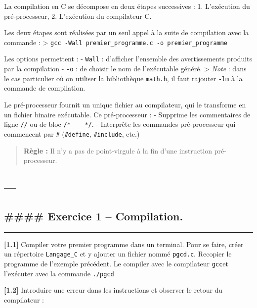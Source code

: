\documentclass[11pt]{article}
\begin{document}
La compilation en C se décompose en deux étapes successives : 1.
L'exécution du pré-processeur, 2. L'exécution du compilateur C.

Les deux étapes sont réalisées par un seul appel à la suite de
compilation avec la commande : \textgreater{}
\texttt{gcc\ -Wall\ premier\_programme.c\ -o\ premier\_programme}

Les options permettent : - \texttt{Wall} : d'afficher l'ensemble des
avertissements produits par la compilation - \texttt{-o} : de choisir le
nom de l'exécutable généré. \textgreater{} \emph{Note} : dans le cas
particulier où on utiliser la bibliothèque \texttt{math.h}, il faut
rajouter \texttt{-lm} à la commande de compilation.

Le pré-processeur fournit un unique fichier au compilateur, qui le
transforme en un fichier binaire exécutable. Ce pré-processeur : -
Supprime les commentaires de ligne \texttt{//} ou de bloc
\texttt{/*\ \ \ \ */}. - Interprête les commandes pré-processeur qui
commencent par \texttt{\#} (\texttt{\#define}, \texttt{\#include}, etc.)

\begin{quote}
\textbf{Règle :} Il n'y a pas de point-virgule à la fin d'une
instruction pré-processeur.
\end{quote}

    \hypertarget{section}{%
\subsection{---}\label{section}}

\hypertarget{exercice-1-compilation.}{%
\subsection{\#\#\#\# Exercice 1 --
Compilation.}\label{exercice-1-compilation.}}

\begin{center}\rule{0.5\linewidth}{0.5pt}\end{center}

\textbf{{[}1.1{]}} Compiler votre premier programme dans un terminal.
Pour se faire, créer un répertoire \texttt{Langage\_C} et y ajouter un
fichier nommé \texttt{pgcd.c}. Recopier le programme de l'exemple
précédent. Le compiler avec le compilateur \texttt{gcc}et l'exécuter
avec la commande \texttt{./pgcd}

\textbf{{[}1.2{]}} Introduire une erreur dans les instructions et
observer le retour du compilateur :
\end{document}
